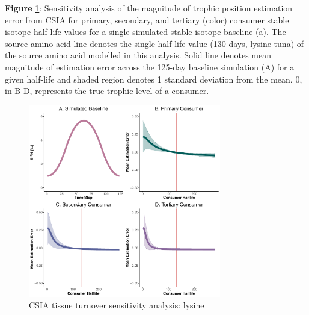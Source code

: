 \documentclass [11pt, proquest] {uwthesis}[2015/03/03]
\begin{document}
\textbf{Figure} \ref{fig:SensCSIAlys}: Sensitivity analysis of the
magnitude of trophic position estimation error from CSIA for primary,
secondary, and tertiary (color) consumer stable isotope half-life values
for a single simulated stable isotope baseline (a). The source amino
acid line denotes the single half-life value (130 days, lysine tuna) of
the source amino acid modelled in this analysis. Solid line denotes mean
magnitude of estimation error across the 125-day baseline simulation (A)
for a given half-life and shaded region denotes 1 standard deviation
from the mean. 0, in B-D, represents the true trophic level of a
consumer. \newline 
\begin{figure}[h]
\centering
  \includegraphics[width=0.75\textwidth]{figure/Ch5/Figure9.pdf}
  \caption{CSIA tissue turnover sensitivity analysis: lysine}
  \label{fig:SensCSIAlys}
\end{figure}
\clearpage
\end{document}
